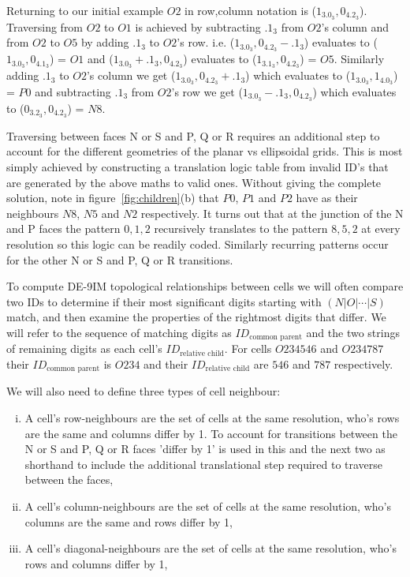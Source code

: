 \documentclass[12pt]{iopart}
\newcommand{\IDparent}{ID_{\text{common~parent}}}
\newcommand{\IDchild}{ID_{\text{relative~child}}}
\begin{document}
Returning to our initial example $O2$ in row,column notation is ($1_3.0_3,0_4.2_3$). Traversing from $O2$ to $O1$ is achieved by subtracting $.1_3$ from $O2$'s column and from $O2$ to $O5$ by adding $.1_3$ to $O2$'s row. i.e. ($1_3.0_3,0_4.2_3-.1_3$) evaluates to ($1_3.0_3,0_4.1_3$) = $O1$ and ($1_3.0_3+.1_3,0_4.2_3$) evaluates to ($1_3.1_3,0_4.2_3$) = $O5$. Similarly adding $.1_3$ to $O2$'s column we get  ($1_3.0_3,0_4.2_3+.1_3$) which evaluates to ($1_3.0_3,1_4.0_3$) = $P0$ and subtracting $.1_3$ from $O2$'s row we get ($1_3.0_3-.1_3,0_4.2_3$) which evaluates to ($0_3.2_3,0_4.2_3$) = $N8$.

Traversing between faces N or S and P, Q or R requires an additional step to account for the different geometries of the planar vs ellipsoidal grids. This is most simply achieved by constructing a translation logic table from invalid ID's that are generated by the above maths to valid ones. Without giving the complete solution, note in figure~\ref{fig:children}(b) that  $P0$, $P1$ and $P2$ have as their neighbours $N8$, $N5$ and $N2$ respectively. It turns out that at the junction of the N and P faces the pattern $0,1,2$ recursively translates to the pattern $8,5,2$ at every resolution so this logic can be readily coded. Similarly recurring patterns occur for the other N or S and P, Q or R transitions.

To compute DE-9IM topological relationships between cells we will often compare two IDs to determine if their most significant digits starting with $(N | O | \cdots | S)$ match, and then examine the properties of the rightmost digits that differ. We will refer to the sequence of matching digits as $\IDparent$ and the two strings of remaining digits as each cell's $\IDchild$. For cells $O234546$ and $O234787$ their $\IDparent$ is $O234$ and their $\IDchild$ are $546$ and $787$ respectively.

We will also need to define three types of cell neighbour:

\begin{enumerate}[(i)]
    \item A cell's row-neighbours are the set of cells at the same resolution, who's rows are the same and columns differ by 1. To account for transitions between the N or S and P, Q or R faces 'differ by 1' is used in this and the next two as shorthand to include the additional translational step required to traverse between the faces,
    \item A cell's column-neighbours are the set of cells at the same resolution, who's columns are the same and rows differ by 1,
    \item A cell's diagonal-neighbours are the set of cells at the same resolution, who's rows and columns differ by 1, 
\end{enumerate}
 
\end{document}
